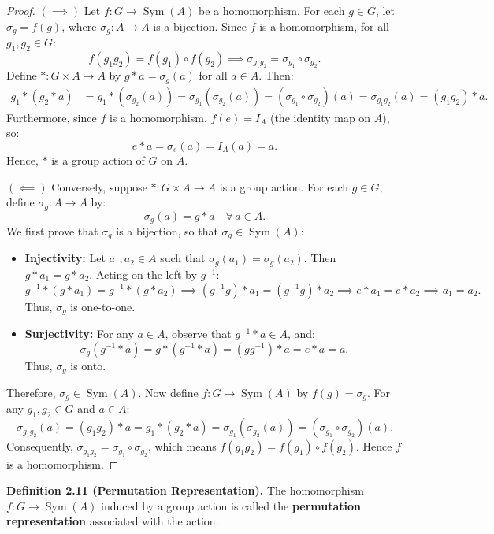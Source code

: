\documentclass[11pt,a4paper]{article}
\DeclareMathOperator{\Sym}{Sym}
\begin{document}
\begin{proof}
$(\implies)$ Let $f : G \to \Sym(A)$ be a homomorphism. For each $g \in G$, let $\sigma_g = f(g)$, where $\sigma_g : A \to A$ is a bijection. Since $f$ is a homomorphism, for all $g_1, g_2 \in G$:
\[
f(g_1 g_2) = f(g_1) \circ f(g_2) \implies \sigma_{g_1 g_2} = \sigma_{g_1} \circ \sigma_{g_2}.
\]
Define $* : G \times A \to A$ by $g * a = \sigma_g(a)$ for all $a \in A$. Then:
\begin{align*}
    g_1 * (g_2 * a) &= g_1 * (\sigma_{g_2}(a)) = \sigma_{g_1}(\sigma_{g_2}(a)) = (\sigma_{g_1} \circ \sigma_{g_2})(a) = \sigma_{g_1 g_2}(a) = (g_1 g_2) * a.
\end{align*}
Furthermore, since $f$ is a homomorphism, $f(e) = I_A$ (the identity map on $A$), so:
\[
e * a = \sigma_e(a) = I_A(a) = a.
\]
Hence, $*$ is a group action of $G$ on $A$.

\medskip
\noindent $(\impliedby)$ Conversely, suppose $* : G \times A \to A$ is a group action. For each $g \in G$, define $\sigma_g : A \to A$ by:
\[
\sigma_g(a) = g * a \quad \forall\, a \in A.
\]
We first prove that $\sigma_g$ is a bijection, so that $\sigma_g \in \Sym(A)$:
\begin{itemize}
    \item \textbf{Injectivity:} Let $a_1, a_2 \in A$ such that $\sigma_g(a_1) = \sigma_g(a_2)$. Then $g * a_1 = g * a_2$. Acting on the left by $g^{-1}$:
    \[
    g^{-1} * (g * a_1) = g^{-1} * (g * a_2) \implies (g^{-1} g) * a_1 = (g^{-1} g) * a_2 \implies e * a_1 = e * a_2 \implies a_1 = a_2.
    \]
    Thus, $\sigma_g$ is one-to-one.
    \item \textbf{Surjectivity:} For any $a \in A$, observe that $g^{-1} * a \in A$, and:
    \[
    \sigma_g(g^{-1} * a) = g * (g^{-1} * a) = (g g^{-1}) * a = e * a = a.
    \]
    Thus, $\sigma_g$ is onto.
\end{itemize}
Therefore, $\sigma_g \in \Sym(A)$. Now define $f : G \to \Sym(A)$ by $f(g) = \sigma_g$. For any $g_1, g_2 \in G$ and $a \in A$:
\[
\sigma_{g_1 g_2}(a) = (g_1 g_2) * a = g_1 * (g_2 * a) = \sigma_{g_1}(\sigma_{g_2}(a)) = (\sigma_{g_1} \circ \sigma_{g_2})(a).
\]
Consequently, $\sigma_{g_1 g_2} = \sigma_{g_1} \circ \sigma_{g_2}$, which means $f(g_1 g_2) = f(g_1) \circ f(g_2)$. Hence $f$ is a homomorphism.
\end{proof}

\begin{defbox}
\textbf{Definition 2.11 (Permutation Representation).} The homomorphism $f : G \to \Sym(A)$ induced by a group action is called the \textbf{permutation representation} associated with the action.
\end{defbox}
\end{document}
